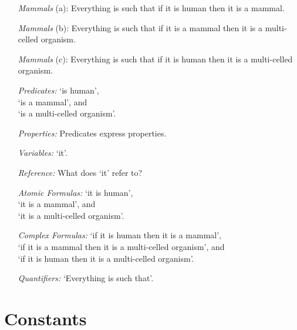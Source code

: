 \documentclass[a4paper, 11pt]{article} %
\begin{document}
\begin{enumerate}
  \item[\textit{Mammals} (a):] Everything is such that if it is human then it is a mammal.
  \item[\textit{Mammals} (b):] Everything is such that if it is a mammal then it is a multi-celled organism.
  \item[\textit{Mammals} (c):] Everything is such that if it is human then it is a multi-celled organism.
  \item[\it Predicates:] 
    `is human',\\ 
    `is a mammal', and\\ 
    `is a multi-celled organism'.
  \item[\it Properties:] Predicates express properties.
  \item[\it Variables:] `it'. 
  \item[\it Reference:] What does `it' refer to?
  \item[\it Atomic Formulas:] 
    `it is human',\\ 
    `it is a mammal', and\\ 
    `it is a multi-celled organism'. 
  \item[\it Complex Formulas:] 
    `if it is human then it is a mammal',\\ 
    `if it is a mammal then it is a multi-celled organism', and\\ 
    `if it is human then it is a multi-celled organism'.
  \item[\it Quantifiers:] `Everything is such that'.
\end{enumerate}





%


\section*{Constants}
\end{document}
